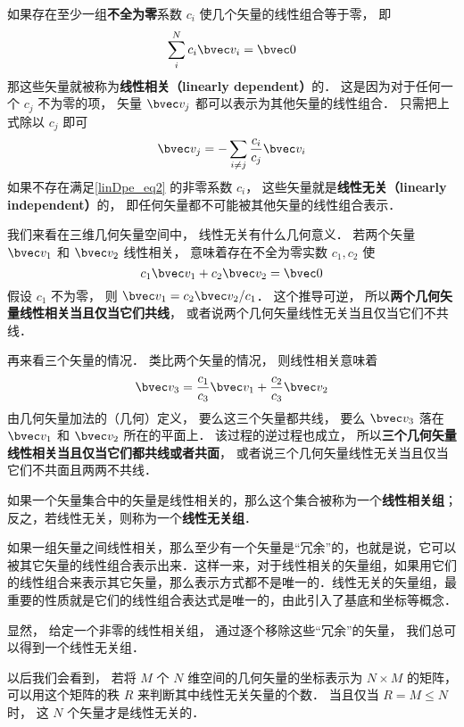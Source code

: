 

如果存在至少一组\textbf{不全为零}系数 $c_i$ 使几个矢量的线性组合等于零， 即
\begin{equation}\label{linDpe_eq2}
\sum_i^N c_i \bvec v_i = \bvec 0
\end{equation}
那这些矢量就被称为\textbf{线性相关（linearly dependent）}的． 这是因为对于任何一个 $c_j$ 不为零的项， 矢量 $\bvec v_j$ 都可以表示为其他矢量的线性组合． 只需把上式除以 $c_j$ 即可
\begin{equation}\label{linDpe_eq3}
\bvec v_j = -\sum_{i \ne j}\frac{c_i}{c_j} \bvec v_i
\end{equation}
如果不存在满足\autoref{linDpe_eq2} 的非零系数 $c_i$， 这些矢量就是\textbf{线性无关（linearly independent）}的， 即任何矢量都不可能被其他矢量的线性组合表示．

\begin{example}{ }\label{linDpe_ex1}
我们来看在三维几何矢量空间中， 线性无关有什么几何意义． 若两个矢量 $\bvec v_1$ 和 $\bvec v_2$ 线性相关， 意味着存在不全为零实数 $c_1, c_2$ 使
\begin{equation}
c_1 \bvec v_1 + c_2 \bvec v_2 = \bvec 0
\end{equation}
假设 $c_1$ 不为零， 则 $\bvec v_1 = c_2 \bvec v_2 / c_1$． 这个推导可逆， 所以\textbf{两个几何矢量线性相关当且仅当它们共线}， 或者说两个几何矢量线性无关当且仅当它们不共线．

再来看三个矢量的情况． 类比两个矢量的情况， 则线性相关意味着
\begin{equation}
\bvec v_3 = \frac{c_1}{c_3} \bvec v_1 +  \frac{c_2}{c_3} \bvec v_2
\end{equation}
由几何矢量加法的（几何）定义， 要么这三个矢量都共线， 要么 $\bvec v_3$ 落在 $\bvec v_1$ 和 $\bvec v_2$ 所在的平面上． 该过程的逆过程也成立， 所以\textbf{三个几何矢量线性相关当且仅当它们都共线或者共面}， 或者说三个几何矢量线性无关当且仅当它们不共面且两两不共线．
\end{example}

如果一个矢量集合中的矢量是线性相关的，那么这个集合被称为一个\textbf{线性相关组}；反之，若线性无关，则称为一个\textbf{线性无关组}．

如果一组矢量之间线性相关，那么至少有一个矢量是“冗余”的，也就是说，它可以被其它矢量的线性组合表示出来．这样一来，对于线性相关的矢量组，如果用它们的线性组合来表示其它矢量，那么表示方式都不是唯一的．线性无关的矢量组，最重要的性质就是它们的线性组合表达式是唯一的，由此引入了基底和坐标等概念．

显然， 给定一个非零的线性相关组， 通过逐个移除这些“冗余”的矢量， 我们总可以得到一个线性无关组．

以后我们会看到， 若将 $M$ 个 $N$ 维空间的几何矢量的坐标表示为 $N\times M$ 的矩阵， 可以用这个矩阵的秩 $R$ 来判断其中线性无关矢量的个数． 当且仅当 $R = M \leqslant N$ 时， 这 $N$ 个矢量才是线性无关的．
